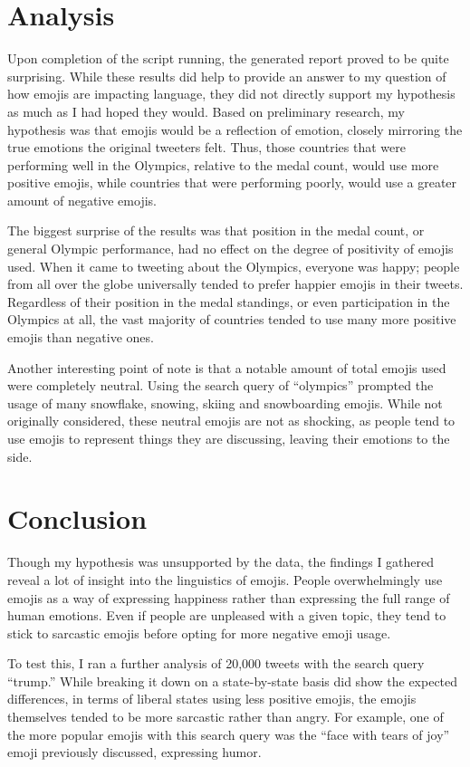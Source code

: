 \documentclass[a4paper,12pt]{article}
\begin{document}
\section{Analysis}
Upon completion of the script running, the generated report proved to be quite surprising. While these results did help to provide an answer to my question of how emojis are impacting language, they did not directly support my hypothesis as much as I had hoped they would. Based on preliminary research, my hypothesis was that emojis would be a reflection of emotion, closely mirroring the true emotions the original tweeters felt. Thus, those countries that were performing well in the Olympics, relative to the medal count, would use more positive emojis, while countries that were performing poorly, would use a greater amount of negative emojis. 

The biggest surprise of the results was that position in the medal count, or general Olympic performance, had no effect on the degree of positivity of emojis used. When it came to tweeting about the Olympics, everyone was happy; people from all over the globe universally tended to prefer happier emojis in their tweets. Regardless of their position in the medal standings, or even participation in the Olympics at all, the vast majority of countries tended to use many more positive emojis than negative ones. 

Another interesting point of note is that a notable amount of total emojis used were completely neutral. Using the search query of “olympics” prompted the usage of many snowflake, snowing, skiing and snowboarding emojis. While not originally considered, these neutral emojis are not as shocking, as people tend to use emojis to represent things they are discussing, leaving their emotions to the side. 

\section{Conclusion}
Though my hypothesis was unsupported by the data, the findings I gathered reveal a lot of insight into the linguistics of emojis. People overwhelmingly use emojis as a way of expressing happiness rather than expressing the full range of human emotions. Even if people are unpleased with a given topic, they tend to stick to sarcastic emojis before opting for more negative emoji usage. 

To test this, I ran a further analysis of 20,000 tweets with the search query “trump.” While breaking it down on a state-by-state basis did show the expected differences, in terms of liberal states using less positive emojis, the emojis themselves tended to be more sarcastic rather than angry. For example, one of the more popular emojis with this search query was the “face with tears of joy” emoji previously discussed, expressing humor. 
\end{document}

